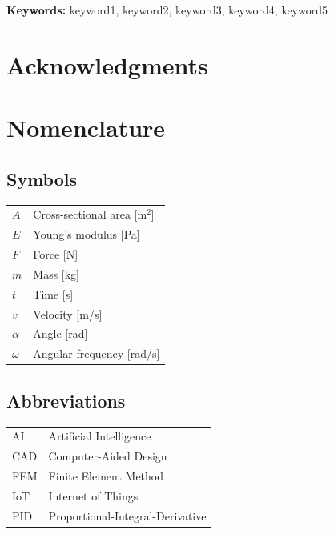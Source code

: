 \documentclass[11pt,a4paper,twoside,openright]{book}
\begin{document}
\vspace{1cm}
\noindent\textbf{Keywords:} keyword1, keyword2, keyword3, keyword4, keyword5

\cleardoublepage

\chapter*{Acknowledgments}


\cleardoublepage

\tableofcontents
\cleardoublepage

\listoffigures
\cleardoublepage

\listoftables
\cleardoublepage

\chapter*{Nomenclature}

\section*{Symbols}
\begin{tabular}{@{}ll@{}}
$A$ & Cross-sectional area [m$^2$] \\
$E$ & Young's modulus [Pa] \\
$F$ & Force [N] \\
$m$ & Mass [kg] \\
$t$ & Time [s] \\
$v$ & Velocity [m/s] \\
$\alpha$ & Angle [rad] \\
$\omega$ & Angular frequency [rad/s] \\
\end{tabular}

\section*{Abbreviations}
\begin{tabular}{@{}ll@{}}
AI & Artificial Intelligence \\
CAD & Computer-Aided Design \\
FEM & Finite Element Method \\
IoT & Internet of Things \\
PID & Proportional-Integral-Derivative \\
\end{tabular}
\end{document}

